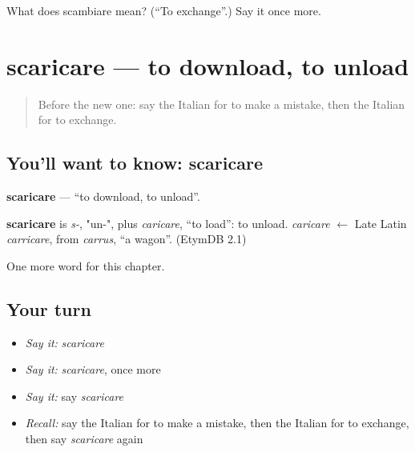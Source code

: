 \begin{tcolorbox}[breakable,colback=teal!4,colframe=teal!35!black,title={Before you move on}]
What does scambiare mean? (\textquotedblleft{}To exchange\textquotedblright{}.) Say it once more.
\end{tcolorbox}
\section[scaricare]{scaricare — to download, to unload}

\label{lesson:IT-C150-scaricare}



\begin{quote}
Before the new one: say the Italian for to make a mistake, then the Italian for to exchange.
\end{quote}

\subsection*{You'll want to know: scaricare}
\textbf{scaricare} — \textquotedblleft{}to download, to unload\textquotedblright{}.

\begin{cousinweb}
\textbf{scaricare} is \emph{s-}, "un-", plus \emph{caricare}, \textquotedblleft{}to load\textquotedblright{}: to unload. \emph{caricare} $\leftarrow$ Late Latin \emph{carricare}, from \emph{carrus}, \textquotedblleft{}a wagon\textquotedblright{}. (EtymDB 2.1)
\end{cousinweb}

\begin{grammarlens}[title={What you've built}]
One more word for this chapter.
\end{grammarlens}

\subsection*{Your turn}
\begin{itemize}
\raggedright
  \item \emph{Say it:} \emph{scaricare}
  \item \emph{Say it:} \emph{scaricare}, once more
  \item \emph{Say it:} say \emph{scaricare}
  \item \emph{Recall:} say the Italian for to make a mistake, then the Italian for to exchange, then say \emph{scaricare} again
\end{itemize}

